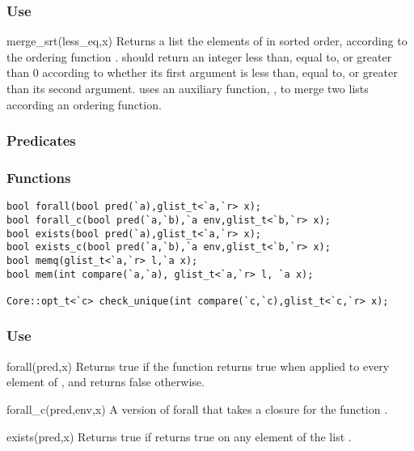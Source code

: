 \subsubsection*{Use}

\begin{defun}{merge_srt}{(less_eq,x)}
Returns a list the elements of  in sorted order, according to the
ordering function .   should return an integer
less than, equal to, or greater than 0 according to whether its first
argument is less than, equal to, or greater than its second argument.
 uses an auxiliary function,
, to merge two lists
according an ordering function.
\end{defun}

\subsubsection*{Predicates}
\subsubsection*{Functions}
\begin{verbatim}
bool forall(bool pred(`a),glist_t<`a,`r> x);
bool forall_c(bool pred(`a,`b),`a env,glist_t<`b,`r> x);
bool exists(bool pred(`a),glist_t<`a,`r> x);
bool exists_c(bool pred(`a,`b),`a env,glist_t<`b,`r> x);
bool memq(glist_t<`a,`r> l,`a x);
bool mem(int compare(`a,`a), glist_t<`a,`r> l, `a x);

Core::opt_t<`c> check_unique(int compare(`c,`c),glist_t<`c,`r> x);
\end{verbatim}

\subsubsection*{Use}

\begin{defun}{forall}{(pred,x)}
Returns true if the function  returns true when applied to
every element of , and returns false otherwise.
\end{defun}

\begin{defun}{forall_c}{(pred,env,x)}
A version of forall that takes a closure for the function .
\end{defun}

\begin{defun}{exists}{(pred,x)}
Returns true if  returns true on any element of the list
.
\end{defun}

